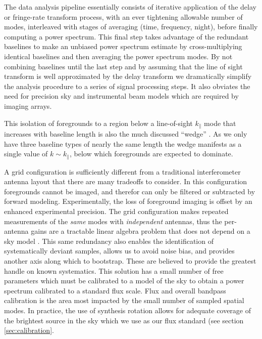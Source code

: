\documentclass[preprint2]{aastex}
\begin{document}
The data analysis pipeline essentially consists of iterative application of the delay or fringe-rate transform process, with an ever tightening allowable number of modes, interleaved with stages of averaging (time, frequency, night), before finally computing a power spectrum.  This final step takes advantage of the redundant baselines to make an unbiased power spectrum estimate by cross-multiplying identical baselines and then averaging the power spectrum modes. By not combining baselines until the last step and by assuming that the line of sight transform is well approximated by the delay transform we dramatically simplify the analysis procedure to a series of signal processing steps. It also obviates the need for precision sky and instrumental beam models which are required by imaging arrays.  

This isolation of foregrounds to a region below a line-of-sight $k_\parallel$ mode that increases with baseline length is also the much discussed ``wedge'' \citep{PhysRevD.90.023018,PhysRevD.90.023019,Thyagarajan:2013p10039,Pober:2013p9942,Trott:2012p10466,Morales:2012p8790,Parsons:2012p8896,Vedantham:2012p10297,Datta:2010p8781,Parsons:2009p7859}. As we only have three baseline types of nearly the same length the wedge manifests as a single value of $k\sim k_\parallel$, below which foregrounds are expected to dominate. 

A grid configuration is sufficiently different from a traditional interferometer antenna layout that 
there are many tradeoffs to consider. In this configuration foregrounds cannot be imaged, and therefor can only be filtered or subtracted by forward modeling.  Experimentally, the loss of foreground imaging is offset by an enhanced experimental precision. The grid configuration makes repeated measurements of the \emph{same} modes with \emph{independent} antennas, thus the per-antenna gains are a tractable linear algebra problem that does not depend on a sky model \citep{Liu:2010p10391}. This same redundancy also enables the identification of systematically deviant samples, allows us to avoid noise bias, and provides another axis along which to bootstrap.  These are believed to provide the greatest handle on known systematics.  This solution has a small number of free parameters which must be calibrated to a model of the sky to obtain a power spectrum calibrated to a standard flux scale.  Flux and overall bandpass calibration is the area most impacted by the small number of sampled spatial modes.  In practice, the use of synthesis rotation allows for adequate coverage of the brightest source in the sky which we use as our flux standard (see section \ref{sec:calibration}. 
\end{document}
